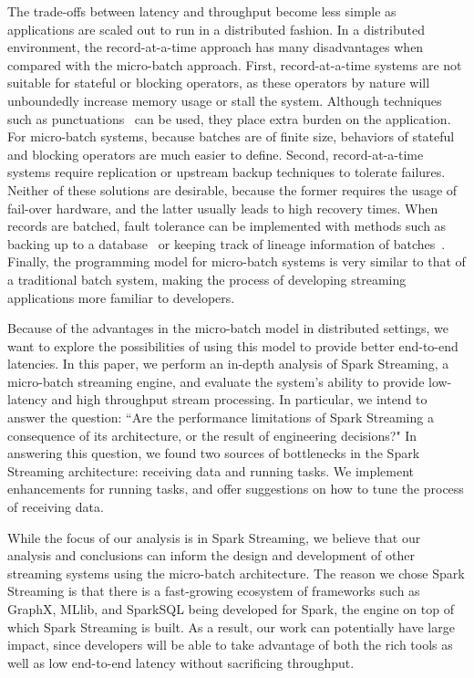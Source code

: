 The trade-offs between latency and throughput become less simple as applications are scaled out to run in a distributed fashion. In a distributed environment, the record-at-a-time approach has many disadvantages when compared with the micro-batch approach.
First, record-at-a-time systems are not suitable for stateful or blocking operators, as these operators by nature will unboundedly increase memory usage or stall the system. Although techniques such as punctuations~\cite{tucker2003exploiting} can be used, they place extra burden on the application. For micro-batch systems, because batches are of finite size, behaviors of stateful and blocking operators are much easier to define.
Second, record-at-a-time systems require replication or upstream backup techniques to tolerate failures. Neither of these solutions are desirable, because the former requires the usage of fail-over hardware, and the latter usually leads to high recovery times. When records are batched, fault tolerance can be implemented with methods such as backing up to a database~\cite{Storm} or keeping track of lineage information of batches~\cite{SparkStreaming}.
Finally, the programming model for micro-batch systems is very similar to that of a traditional batch system, making the process of developing streaming applications more familiar to developers.

Because of the advantages in the micro-batch model in distributed settings, we want to explore the possibilities of using this model to provide better end-to-end latencies. In this paper, we perform an in-depth analysis of Spark Streaming, a micro-batch streaming engine, and evaluate the system's ability to provide low-latency and high throughput stream processing.
In particular, we intend to answer the question: ``Are the performance limitations of Spark Streaming a consequence of its architecture, or the result of engineering decisions?"
In answering this question, we found two sources of bottlenecks  in the Spark Streaming architecture: receiving data and running tasks. We implement enhancements for running tasks, and offer suggestions on how to tune the process of receiving data.

While the focus of our analysis is in Spark Streaming, we believe that our analysis and conclusions can inform the design and development of other streaming systems using the micro-batch architecture. The reason we chose Spark Streaming is that there is a fast-growing ecosystem of frameworks such as GraphX, MLlib, and SparkSQL being developed for Spark, the engine on top of which Spark Streaming is built. As a result, our work can potentially have large impact, since developers will be able to take advantage of both the rich tools as well as low end-to-end latency without sacrificing throughput.

